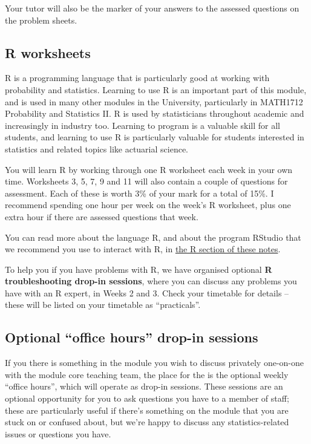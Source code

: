 \documentclass[
  a4paper,
]{book}
\theoremstyle{definition}
\theoremstyle{definition}
\theoremstyle{definition}
\theoremstyle{definition}
\theoremstyle{remark}
\begin{document}
Your tutor will also be the marker of your answers to the assessed questions on the problem sheets.

\hypertarget{r-worksheets}{%
\subsection*{R worksheets}\label{r-worksheets}}

R is a programming language that is particularly good at working with probability and statistics. Learning to use R is an important part of this module, and is used in many other modules in the University, particularly in MATH1712 Probability and Statistics II. R is used by statisticians throughout academic and increasingly in industry too. Learning to program is a valuable skill for all students, and learning to use R is particularly valuable for students interested in statistics and related topics like actuarial science.

You will learn R by working through one R worksheet each week in your own time. Worksheets 3, 5, 7, 9 and 11 will also contain a couple of questions for assessment. Each of these is worth 3\% of your mark for a total of 15\%. I recommend spending one hour per week on the week's R worksheet, plus one extra hour if there are assessed questions that week.

You can read more about the language R, and about the program RStudio that we recommend you use to interact with R, in \protect\hyperlink{R}{the R section of these notes}.

To help you if you have problems with R, we have organised optional \textbf{R troubleshooting drop-in sessions}, where you can discuss any problems you have with an R expert, in Weeks 2 and 3. Check your timetable for details -- these will be listed on your timetable as ``practicals''.

\hypertarget{dropin}{%
\subsection*{Optional ``office hours'' drop-in sessions}\label{dropin}}

If you there is something in the module you wish to discuss privately one-on-one with the module core teaching team, the place for the is the optional weekly ``office hours'', which will operate as drop-in sessions. These sessions are an optional opportunity for you to ask questions you have to a member of staff; these are particularly useful if there's something on the module that you are stuck on or confused about, but we're happy to discuss any statistics-related issues or questions you have.
\end{document}
